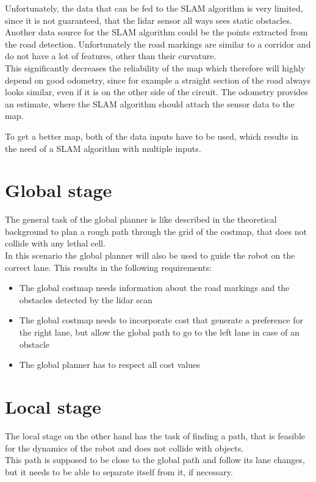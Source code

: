 Unfortunately, the data that can be fed to the SLAM algorithm is very limited, since it is not guaranteed, that the lidar sensor all ways sees static obstacles. Another data source for the SLAM algorithm could be the points extracted from the road detection. Unfortunately the road markings are similar to a corridor and do not have a lot of features, other than their curvature.\\

This significantly decreases the reliability of the map which therefore will highly depend on good odometry, since for example a straight section of the road always looks similar, even if it is on the other side of the circuit. The odometry provides an estimate, where the SLAM algorithm should attach the sensor data to the map.

To get a better map, both of the data inputs have to be used, which results in the need of a SLAM algorithm with multiple inputs.\\


\section{Global stage}
The general task of the global planner is like described in the theoretical background to plan a rough path through the grid of the costmap, that does not collide with any lethal cell.\\

In this scenario the global planner will also be used to guide the robot on the correct lane. This results in the following requirements:

\begin{itemize}
	\item The global costmap needs information about the road markings and the obstacles detected by the lidar scan
	\item The global costmap needs to incorporate cost that generate a preference for the right lane, but allow the global path to go to the left lane in case of an obstacle
	\item The global planner has to respect all cost values
\end{itemize}

\section{Local stage}
The local stage on the other hand has the task of finding a path, that is feasible for the dynamics of the robot and does not collide with objects.\\
This path is supposed to be close to the global path and follow its lane changes, but it needs to be able to separate itself from it, if necessary.

